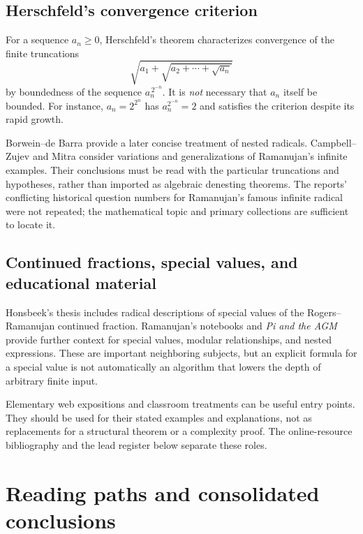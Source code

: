 \documentclass[11pt,a4paper]{article}
\theoremstyle{definition}
\theoremstyle{remark}
\numberwithin{equation}{section}
\begin{document}
\subsection{Herschfeld's convergence criterion}

For a sequence $a_n\ge0$, Herschfeld's theorem characterizes convergence of the finite truncations
\[
 \sqrt{a_1+\sqrt{a_2+\cdots+\sqrt{a_n}}}
\]
by boundedness of the sequence $a_n^{\,2^{-n}}$. It is \emph{not} necessary that $a_n$ itself be bounded. For instance, $a_n=2^{2^n}$ has $a_n^{2^{-n}}=2$ and satisfies the criterion despite its rapid growth.\cite{herschfeld}

Borwein--de Barra provide a later concise treatment of nested radicals. Campbell--Zujev and Mitra consider variations and generalizations of Ramanujan's infinite examples. Their conclusions must be read with the particular truncations and hypotheses, rather than imported as algebraic denesting theorems. The reports' conflicting historical question numbers for Ramanujan's famous infinite radical were not repeated; the mathematical topic and primary collections are sufficient to locate it.\cite{borweindebarra,campbell,mitra,ramanujan}

\subsection{Continued fractions, special values, and educational material}

Honsbeek's thesis includes radical descriptions of special values of the Rogers--Ramanujan continued fraction. Ramanujan's notebooks and \emph{Pi and the AGM} provide further context for special values, modular relationships, and nested expressions. These are important neighboring subjects, but an explicit formula for a special value is not automatically an algorithm that lowers the depth of arbitrary finite input.\cite{honsbeek2005,berndtIV,berndtV,borweinagm}

Elementary web expositions and classroom treatments can be useful entry points. They should be used for their stated examples and explanations, not as replacements for a structural theorem or a complexity proof. The online-resource bibliography and the lead register below separate these roles.

\section{Reading paths and consolidated conclusions}
\label{sec:reading}
\end{document}
